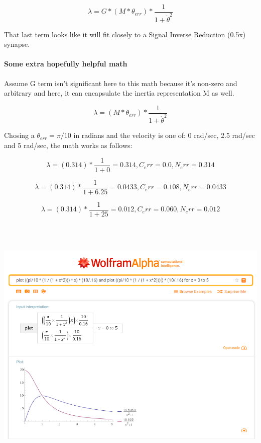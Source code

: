 \documentclass[12pt, letterpaper, oneside, notitlepage, onecolumn]{article}
\newcommand{\subsubsubsection}{\paragraph}
\newcommand{\bbssss}[1]{\subsubsubsection{#1}}
\begin{document}
\begin{equation}
\lambda = G * (M * \theta_{err}) * \dfrac{1}{1 + \dot{\theta}^{2}}
\end{equation}

That last term looks like it will fit closely to a Signal Inverse Reduction (0.5x) synapse.

\bbssss{Some extra hopefully helpful math}

Assume G term isn't significant here to this math because it's non-zero and arbitrary and here, it can encapsulate the inertia representation M as well.

\begin{equation}
\lambda = (M * \theta_{err}) * \dfrac{1}{1 + \dot{\theta}^{2}}
\end{equation}

Chosing a $\theta_{err} = \pi / 10$ in radians and the velocity is one of: 0 rad/sec, 2.5 rad/sec and 5 rad/sec, the math works as follows: 

\begin{equation}
\lambda = (0.314) * \dfrac{1}{1 + 0} = 0.314, C_err = 0.0, N_err = 0.314
\end{equation}

\begin{equation}
\lambda = (0.314) * \dfrac{1}{1 + 6.25} = 0.0433, C_err = 0.108, N_err = 0.0433
\end{equation}

\begin{equation}
\lambda = (0.314) * \dfrac{1}{1 + 25} = 0.012, C_err = 0.060, N_err = 0.012
\end{equation}

\includegraphics[height=5in, angle=0]{UnderstandingErrorCorrection}
\end{document}
